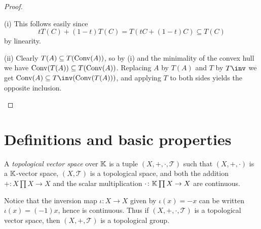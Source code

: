 \documentclass[article, a4paper, 11pt, oneside]{memoir}
\numberwithin{equation}{chapter}
\newcommand{\calT}{\mathcal{T}}
\begin{document}
\begin{proof}
\begin{proofsec}
    \item[(i)]
    This follows easily since
    \begin{equation*}
        t T(C) + (1-t) T(C)
            = T(tC + (1-t)C)
            \subseteq T(C)
    \end{equation*}
    by linearity.

    \item[(ii)]
    Clearly $T(A) \subseteq T(\operatorname{Conv}(A))$, so by (i) and the minimality of the convex hull we have $\operatorname{Conv}(T(A)) \subseteq T(\operatorname{Conv}(A))$. Replacing $A$ by $T(A)$ and $T$ by $T\inv$ we get $\conv(A) \subseteq T\inv(\conv(T(A)))$, and applying $T$ to both sides yields the opposite inclusion.
\end{proofsec}
\end{proof}


\section{Definitions and basic properties}

\begin{definition}
    A \emph{topological vector space} over $\mathbb{K}$ is a tuple $(X, +, \cdot, \calT)$ such that $(X, +, \cdot)$ is a $\mathbb{K}$-vector space, $(X, \calT)$ is a topological space, and both the addition $+ \colon X \prod X \to X$ and the scalar multiplication $\cdot \colon \mathbb{K} \prod X \to X$ are continuous.
\end{definition}
%
Notice that the inversion map $\iota \colon X \to X$ given by $\iota(x) = -x$ can be written $\iota(x) = (-1)x$, hence is continuous. Thus if $(X, +, \cdot, \calT)$ is a topological vector space, then $(X, +, \calT)$ is a topological group.
\end{document}
